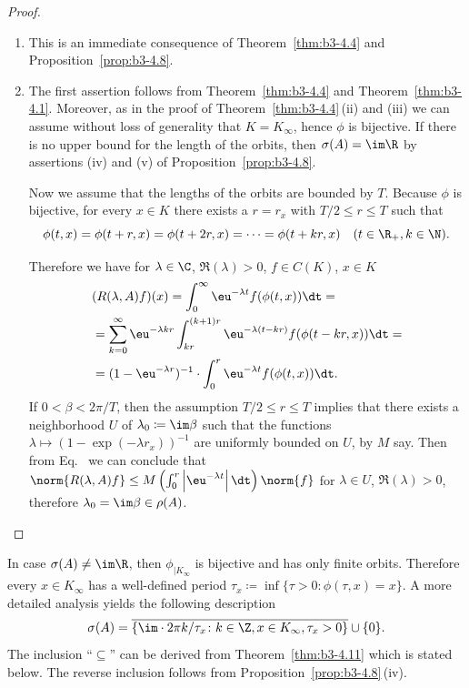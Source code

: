 \begin{proof}
\begin{enumerate}[\upshape (i), wide, labelindent=.25em]%
\item 
	This is an immediate consequence of Theorem~\ref{thm:b3-4.4} and Proposition~\ref{prop:b3-4.8}.
	
\item 
	The first assertion follows from Theorem~\ref{thm:b3-4.4} and Theorem~\ref{thm:b3-4.1}.
	Moreover, as in the proof of Theorem~\ref{thm:b3-4.4}\,(ii) and (iii) we can assume without loss of generality that $K = K_{\infty}$, hence $\phi$ is bijective.
	If there is no upper bound for the length of the orbits, then $\sigma(A) = \im\R$ by assertions (iv) and (v) of Proposition~\ref{prop:b3-4.8}.
	
	Now we assume that the lengths of the orbits are bounded by $T$.
	Because $\phi$ is bijective, for every $x \in K$ there exists a $r = r_{x}$ with $T/2 \leq r \leq T$ such that 
	\[
	\phi(t,x) = \phi(t+r,x) = \phi(t+2r,x) = \cdots = \phi(t+kr,x) \quad (t \in \R_{+}, k \in \N).
	\]
	
	Therefore we have for $\lambda \in \C$, $\Re(\lambda) > 0$, $f \in C(K)$, $x \in K$
	\begin{equation}\label{eq:b3-4.15}
		\begin{aligned}
			&(R(\lambda,A)f)(x) = \int_{0}^{\infty} \eu^{-\lambda t}f(\phi(t,x)) \dt = \\
			&= \sum_{k=0}^{\infty} \eu^{-\lambda kr}\int_{kr}^{(k+1)r} \eu^{-\lambda(t-kr)} f(\phi(t-kr,x)) \dt =  \\
			&= (1 - \eu^{-\lambda r})^{-1}\cdot\int_{0}^{r} \eu^{-\lambda t} f(\phi(t,x)) \dt.
		\end{aligned}
	\end{equation}
	If\/ $0 < \beta < 2\pi/T$, then the assumption $T/2 \leq r \leq T$ implies that there exists a neighborhood $U$ of\/ $\lambda_{0} \coloneq \im\beta$ such that the functions $\lambda \mapsto (1 - \exp(-\lambda r_{x}))^{-1}$ are uniformly bounded on $U$, by $M$ say.
    Then from Eq.~ we can conclude that $\norm{R(\lambda,A)f} \leq M\left(\int_{0}^{r} \left|\eu^{-\lambda t}\right|\dt\right)\norm{f}$ for $\lambda \in U$, $\Re(\lambda) > 0$, therefore $\lambda_{0} = \im\beta \in \rho(A)$.
\end{enumerate}
\end{proof}
\begin{remark}\label{rem:b3-4.10}
	In case $\sigma(A) \neq \im\R$, then $\phi_{|K_{\infty}}$ is bijective and has only finite orbits.
	Therefore every $x \in K_{\infty}$ has a well-defined period $\tau_{x} \coloneq \inf\{\tau > 0 \colon \phi(\tau,x) = x\}$.
	A more detailed analysis yields the following description 
	\begin{equation}\label{eq:b3-4.16}
		\sigma(A) = \overline{\{\im \cdot 2\pi k/\tau_{x} \colon k \in \Z, x \in K_{\infty}, \tau_{x} > 0\}} \cup \{0\}.
	\end{equation}
	The inclusion \enquote{$\subseteq$} can be derived from Theorem~\ref{thm:b3-4.11} which is stated below.
	The reverse inclusion follows from Proposition~\ref{prop:b3-4.8}\,(iv).
\end{remark}
	
